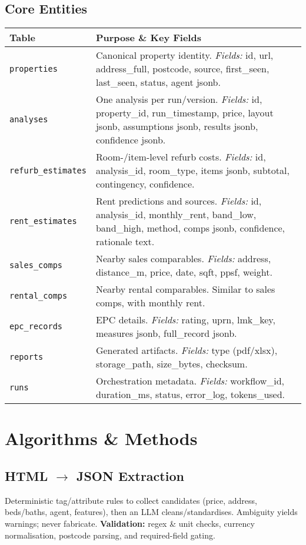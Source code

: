 \documentclass[12pt,a4paper]{article}
\begin{document}
\subsection{Core Entities}
\begin{longtable}{@{}p{3.2cm}p{12.4cm}@{}}
\toprule
\textbf{Table} & \textbf{Purpose \& Key Fields} \\
\midrule
\texttt{properties} & Canonical property identity. \textit{Fields:} id, url, address\_full, postcode, source, first\_seen, last\_seen, status, agent jsonb. \\
\texttt{analyses} & One analysis per run/version. \textit{Fields:} id, property\_id, run\_timestamp, price, layout jsonb, assumptions jsonb, results jsonb, confidence jsonb. \\
\texttt{refurb\_estimates} & Room-/item-level refurb costs. \textit{Fields:} id, analysis\_id, room\_type, items jsonb, subtotal, contingency, confidence. \\
\texttt{rent\_estimates} & Rent predictions and sources. \textit{Fields:} id, analysis\_id, monthly\_rent, band\_low, band\_high, method, comps jsonb, confidence, rationale text. \\
\texttt{sales\_comps} & Nearby sales comparables. \textit{Fields:} address, distance\_m, price, date, sqft, ppsf, weight. \\
\texttt{rental\_comps} & Nearby rental comparables. Similar to sales comps, with monthly rent. \\
\texttt{epc\_records} & EPC details. \textit{Fields:} rating, uprn, lmk\_key, measures jsonb, full\_record jsonb. \\
\texttt{reports} & Generated artifacts. \textit{Fields:} type (pdf/xlsx), storage\_path, size\_bytes, checksum. \\
\texttt{runs} & Orchestration metadata. \textit{Fields:} workflow\_id, duration\_ms, status, error\_log, tokens\_used. \\
\bottomrule
\end{longtable}

\section{Algorithms \& Methods}
\subsection{HTML $\rightarrow$ JSON Extraction}
Deterministic tag/attribute rules to collect candidates (price, address, beds/baths, agent, features), then an LLM cleans/standardises. Ambiguity yields warnings; never fabricate. \textbf{Validation:} regex \& unit checks, currency normalisation, postcode parsing, and required-field gating.
\end{document}

